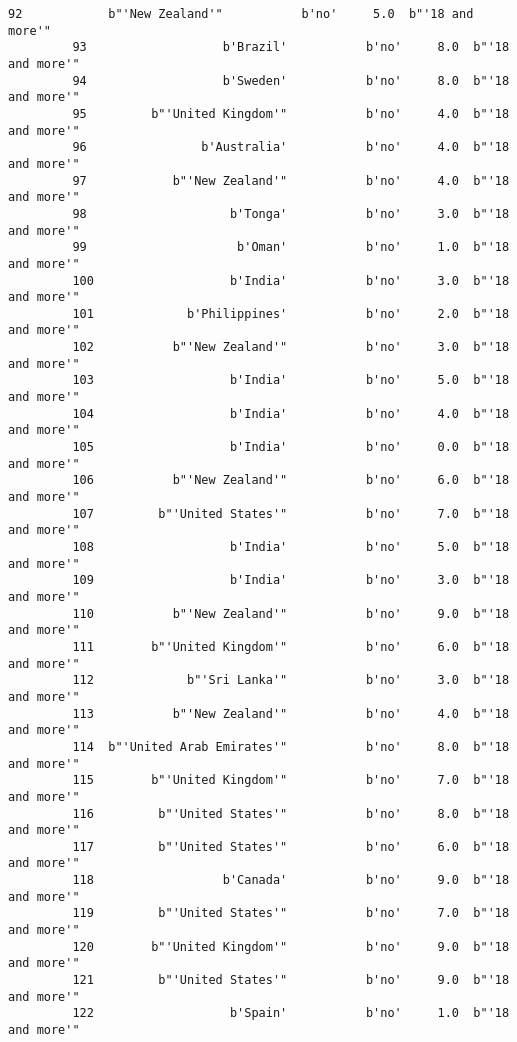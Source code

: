 \documentclass[11pt]{article}
\begin{document}
\begin{Verbatim}[commandchars=\\\{\}]
         92            b"'New Zealand'"           b'no'     5.0  b"'18 and more'"   
         93                   b'Brazil'           b'no'     8.0  b"'18 and more'"   
         94                   b'Sweden'           b'no'     8.0  b"'18 and more'"   
         95         b"'United Kingdom'"           b'no'     4.0  b"'18 and more'"   
         96                b'Australia'           b'no'     4.0  b"'18 and more'"   
         97            b"'New Zealand'"           b'no'     4.0  b"'18 and more'"   
         98                    b'Tonga'           b'no'     3.0  b"'18 and more'"   
         99                     b'Oman'           b'no'     1.0  b"'18 and more'"   
         100                   b'India'           b'no'     3.0  b"'18 and more'"   
         101             b'Philippines'           b'no'     2.0  b"'18 and more'"   
         102           b"'New Zealand'"           b'no'     3.0  b"'18 and more'"   
         103                   b'India'           b'no'     5.0  b"'18 and more'"   
         104                   b'India'           b'no'     4.0  b"'18 and more'"   
         105                   b'India'           b'no'     0.0  b"'18 and more'"   
         106           b"'New Zealand'"           b'no'     6.0  b"'18 and more'"   
         107         b"'United States'"           b'no'     7.0  b"'18 and more'"   
         108                   b'India'           b'no'     5.0  b"'18 and more'"   
         109                   b'India'           b'no'     3.0  b"'18 and more'"   
         110           b"'New Zealand'"           b'no'     9.0  b"'18 and more'"   
         111        b"'United Kingdom'"           b'no'     6.0  b"'18 and more'"   
         112             b"'Sri Lanka'"           b'no'     3.0  b"'18 and more'"   
         113           b"'New Zealand'"           b'no'     4.0  b"'18 and more'"   
         114  b"'United Arab Emirates'"           b'no'     8.0  b"'18 and more'"   
         115        b"'United Kingdom'"           b'no'     7.0  b"'18 and more'"   
         116         b"'United States'"           b'no'     8.0  b"'18 and more'"   
         117         b"'United States'"           b'no'     6.0  b"'18 and more'"   
         118                  b'Canada'           b'no'     9.0  b"'18 and more'"   
         119         b"'United States'"           b'no'     7.0  b"'18 and more'"   
         120        b"'United Kingdom'"           b'no'     9.0  b"'18 and more'"   
         121         b"'United States'"           b'no'     9.0  b"'18 and more'"   
         122                   b'Spain'           b'no'     1.0  b"'18 and more'"   

\end{Verbatim}
\end{document}
